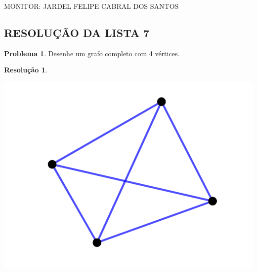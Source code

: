 \documentclass[12pt, a4paper]{article}
\theoremstyle{definition} \newtheorem{prob}{Problema}
\newtheorem*{res}{Resolução}
\begin{document}
\begin{flushleft}

MONITOR: JARDEL FELIPE CABRAL DOS SANTOS\\[0.75em] 
\end{flushleft}

\begin{center}
\section*{\normalsize RESOLUÇÃO DA LISTA 7\\[0.25em]} 
\end{center}

\begin{prob} %
Desenhe um grafo completo com 4 vértices.

\dotfill
\begin{res}
\end{res}
\begin{center}
\includegraphics[scale=1]{gcompleto_4vertices.png}
\end{center}
\dotfill
\end{prob}
\end{document}
